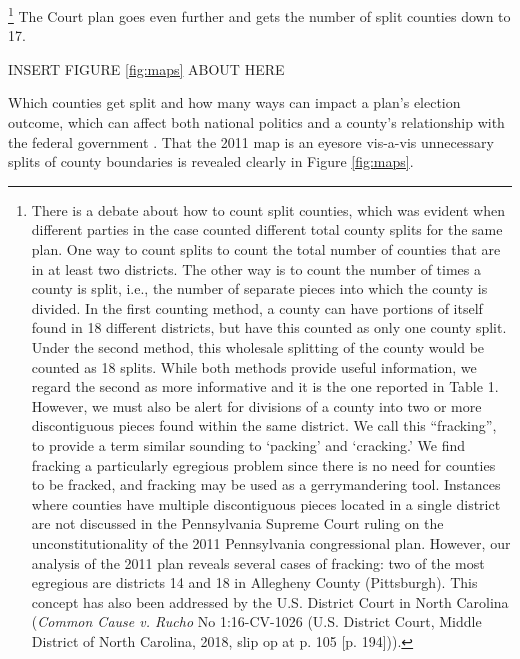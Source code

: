         \footnote{There is a debate about how to count split counties, which was evident when different parties in the case counted different total county splits for the same plan. One way to count splits to count the total number of counties that are in at least two districts. The other way is to count the number of times a county is split, i.e., the number of separate pieces into which the county is divided. In the first counting method, a county can have portions of itself found in 18 different districts, but have this counted as only one county split. Under the second method, this wholesale splitting of the county would be counted as 18 splits. While both methods provide useful information, we regard the second as more informative and it is the one reported in Table 1. However, we must also be alert for divisions of a county into two or more discontiguous pieces found within the same district. We call this ``fracking”, to provide a term similar sounding to ‘packing’ and ‘cracking.’ We find fracking a particularly egregious problem since there is no need for counties to be fracked, and fracking may be used as a gerrymandering tool. Instances where counties have multiple discontiguous pieces located in a single district are not discussed in the Pennsylvania Supreme Court ruling on the unconstitutionality of the 2011 Pennsylvania congressional plan. However, our analysis of the 2011 plan reveals several cases of fracking: two of the most egregious are districts 14 and 18 in Allegheny County (Pittsburgh). This concept has also been addressed by the U.S. District Court in North Carolina (\textit{Common Cause v. Rucho} No 1:16-CV-1026 (U.S. District Court, Middle District of North Carolina, 2018, slip op at p. 105 [p. 194])).}
    The Court plan goes even further and gets the number of split counties down to 17.
	
		\begin{center} INSERT FIGURE \ref{fig:maps} ABOUT HERE \end{center}
\par
    Which counties get split and how many ways can impact a plan’s election outcome, which can affect both national politics and a county's relationship with the federal government \citep{Ansolabehere2002a}. That the 2011 map is an eyesore vis-a-vis unnecessary splits of county boundaries is revealed clearly in Figure \ref{fig:maps}.
%
